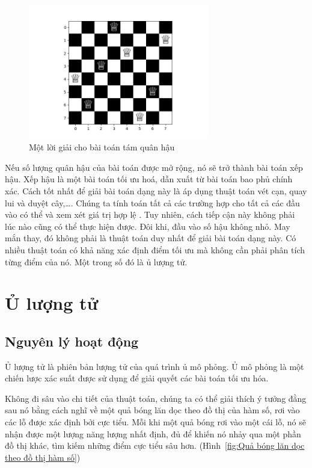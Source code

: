 \begin{figure}[h]
	\centering
	\includegraphics[width=0.7\textwidth]{images/8-queens-solution.png}
	\caption{Một lời giải cho bài toán tám quân hậu}
	\label{fig:8-queens-solution}
	
\end{figure}

Nếu số lượng quân hậu của bài toán được mở rộng, nó sẽ trở thành bài toán xếp hậu. 
Xếp hậu là một bài toán tối ưu hoá, dẫn xuất từ bài toán bao phủ chính xác. Cách tốt nhất để giải bài toán dạng này là áp dụng thuật toán vét cạn, quay lui và duyệt cây,\dots . Chúng ta tính toán tất cả các trường hợp cho tất cả các đầu vào có thể và xem xét giá trị hợp lệ . Tuy nhiên, cách tiếp cận này không phải lúc nào cũng có thể thực hiện được. Đôi khi, đầu vào số hậu không nhỏ.
May mắn thay, đó không phải là thuật toán duy nhất để giải bài toán dạng này. Có nhiều thuật toán có khả năng xác định điểm tối ưu mà không cần phải phân tích từng điểm của nó. Một trong số đó là ủ lượng tử.

\section{Ủ lượng tử}

\subsection{Nguyên lý hoạt động}
Ủ lượng tử là phiên bản lượng tử của quá trình ủ mô phỏng.
Ủ mô phỏng là một chiến lược xác suất được sử dụng để giải quyết các bài toán tối ưu hóa.

Không đi sâu vào chi tiết của thuật toán, chúng ta có thể giải thích ý tưởng đằng sau nó bằng cách nghĩ về một quả bóng lăn dọc theo đồ thị của hàm số, rơi vào các lỗ được xác định bởi cực tiểu. Mỗi khi một quả bóng rơi vào một cái lỗ, nó sẽ nhận được một lượng năng lượng nhất định, đủ để khiến nó nhảy qua một phần đồ thị khác, tìm kiếm những điểm cực tiểu sâu hơn. (Hình~\ref{fig:Quả bóng lăn dọc theo đồ thị hàm số})

